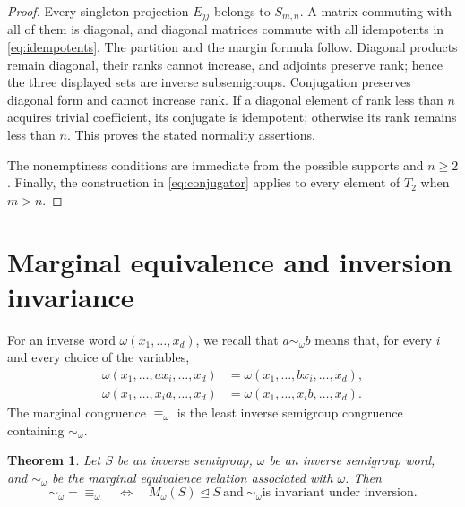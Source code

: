 \documentclass[11pt,a4paper,reqno]{amsart}
\newtheorem{theorem}{Theorem}[section]
\newcommand{\Sn}{S_{m,n}}
\numberwithin{equation}{section}
\begin{document}
\begin{proof}
Every singleton projection $E_{jj}$ belongs to $\Sn$. A matrix commuting with all of them is diagonal, and diagonal matrices commute with all idempotents in \eqref{eq:idempotents}. The partition and the margin formula follow. Diagonal products remain diagonal, their ranks cannot increase, and adjoints preserve rank; hence the three displayed sets are inverse subsemigroups. Conjugation preserves diagonal form and cannot increase rank. If a diagonal element of rank less than $n$ acquires trivial coefficient, its conjugate is idempotent; otherwise its rank remains less than $n$. This proves the stated normality assertions.

The nonemptiness conditions are immediate from the possible supports and $n\ge2$. Finally, the construction in \eqref{eq:conjugator} applies to every element of $T_2$ when $m>n$.
\end{proof}


\section{Marginal equivalence and inversion invariance}\label{sec:equivalence}

For an inverse word $\omega(x_1,\ldots,x_d)$, we recall that $a\sim_\omega b$ means that, for every $i$ and every choice of the variables,
\[
\begin{aligned}
\omega(x_1,\ldots,ax_i,\ldots,x_d)&=\omega(x_1,\ldots,bx_i,\ldots,x_d),\\
\omega(x_1,\ldots,x_i a,\ldots,x_d)&=\omega(x_1,\ldots,x_i b,\ldots,x_d).
\end{aligned}
\]
The marginal congruence $\equiv_\omega$ is the least inverse semigroup congruence containing $\sim_\omega$.



\begin{theorem}\label{thm:general-equivalence}
Let $S$ be an inverse semigroup, $\omega$ be an inverse semigroup word, and $\sim_\omega$ be the marginal equivalence relation associated with $\omega$. Then
\[
\sim_\omega=\equiv_\omega \quad\Longleftrightarrow\quad  M_\omega(S)\trianglelefteq S \ \text{and}\
\sim_\omega\text{is invariant under inversion}.
\]
\end{theorem}
\end{document}
